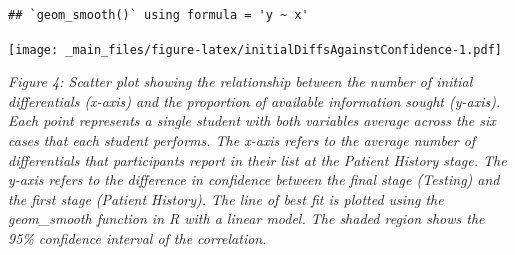 \documentclass[a4paper, nobind]{templates/ociamthesis}
\newenvironment{Shaded}{\begin{snugshade}}{\end{snugshade}}
\newcommand{\AttributeTok}[1]{\textcolor[rgb]{0.13,0.29,0.53}{#1}}
\newcommand{\ConstantTok}[1]{\textcolor[rgb]{0.56,0.35,0.01}{#1}}
\newcommand{\DecValTok}[1]{\textcolor[rgb]{0.00,0.00,0.81}{#1}}
\newcommand{\DocumentationTok}[1]{\textcolor[rgb]{0.56,0.35,0.01}{\textbf{\textit{#1}}}}
\newcommand{\FunctionTok}[1]{\textcolor[rgb]{0.13,0.29,0.53}{\textbf{#1}}}
\newcommand{\NormalTok}[1]{#1}
\newcommand{\OtherTok}[1]{\textcolor[rgb]{0.56,0.35,0.01}{#1}}
\newcommand{\SpecialCharTok}[1]{\textcolor[rgb]{0.81,0.36,0.00}{\textbf{#1}}}
\newcommand{\StringTok}[1]{\textcolor[rgb]{0.31,0.60,0.02}{#1}}
\renewenvironment{Shaded}
{
  \vspace{10pt}%
  \begin{snugshade}%
}{%
  \end{snugshade}%
  \vspace{8pt}%
}
\begin{document}
\begin{Shaded}
\end{Shaded}

\begin{verbatim}
## `geom_smooth()` using formula = 'y ~ x'
\end{verbatim}

\texttt{[image: \_main\_files/figure-latex/initialDiffsAgainstConfidence-1.pdf]}

\emph{Figure 4: Scatter plot showing the relationship between the number of initial differentials (x-axis) and the proportion of available information sought (y-axis). Each point represents a single student with both variables average across the six cases that each student performs. The x-axis refers to the average number of differentials that participants report in their list at the Patient History stage. The y-axis refers to the difference in confidence between the final stage (Testing) and the first stage (Patient History). The line of best fit is plotted using the geom\_smooth function in R with a linear model. The shaded region shows the 95\% confidence interval of the correlation.}
\end{document}

